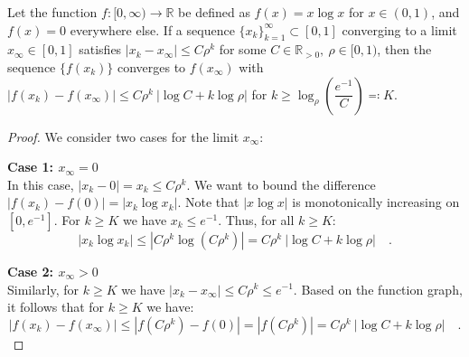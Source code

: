 \documentclass[../../main.tex]{subfiles}
\begin{document}
\begin{lemma}
\label{lemma:xlogx_exponential_convergence}
Let the function $f: [0, \infty) \to \mathbb{R}$ be defined as $f(x) = x \log x$ for $x \in (0, 1)$, and $f(x) = 0$ everywhere else. If a sequence $\{x_k\}_{k=1}^\infty \subset [0,1]$ converging to a limit $x_\infty \in [0,1]$ satisfies $|x_k - x_\infty| \leq C \rho^k$ for some $C \in \mathbb{R}_{>0}, \ \rho \in [0, 1)$, then the sequence $\{f(x_k)\}$ converges to $f(x_\infty)$ with $|f(x_k) - f(x_\infty)| \leq C \rho^k \ |\log C + k \log \rho|$ for $k \geq \log_\rho \left( \dfrac{e^{-1}}{C} \right) \eqqcolon K$.
\end{lemma}
\vspace{-2.5em}
\begin{proof}
We consider two cases for the limit $x_\infty$:

\textbf{Case 1: $x_\infty = 0$} \\
In this case, $|x_k - 0| = x_k \le C \rho^k$. We want to bound the difference $|f(x_k) - f(0)| = |x_k \log x_k|$.
Note that $|x \log x|$ is monotonically increasing on $[0, e^{-1}]$. For $k \geq K$ we have $x_k \leq e^{-1}$. Thus, for all $k \geq K$:
\[
    |x_k \log x_k| \leq |C \rho^k \log (C \rho^k)| = C \rho^k \ |\log C + k \log \rho| \quad .
\]

\textbf{Case 2: $x_\infty > 0$} \\
Similarly, for $k \geq K$ we have $|x_k - x_\infty| \leq C \rho^k \leq e^{-1}$. Based on the function graph, it follows that for $k \geq K$ we have:
\[
    |f(x_k) - f(x_\infty)| \leq |f(C \rho^k) - f(0)| = |f(C \rho^k)| = C \rho^k \ |\log C + k \log \rho| \quad .
\]
\end{proof}
\end{document}

